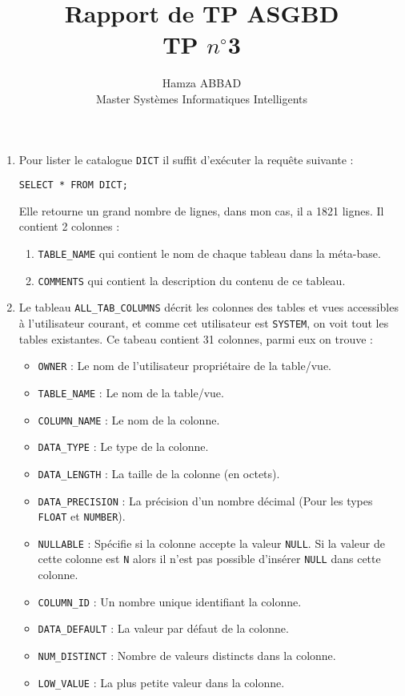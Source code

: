 \documentclass[12pt,a4paper]{article}
\author{Hamza ABBAD\\ Master Systèmes Informatiques Intelligents}
\title{\textbf{Rapport de TP ASGBD} \\ TP $n^{\circ}$3}
\begin{document}
\maketitle
\begin{enumerate}
	\item Pour lister le catalogue \texttt{DICT} il suffit d'exécuter la requête suivante :
	\begin{lstlisting}[style=OracleSQL]
		SELECT * FROM DICT;
	\end{lstlisting}
	Elle retourne un grand nombre de lignes, dans mon cas, il a 1821 lignes. Il contient 2 colonnes :
	\begin{enumerate}
		\item \texttt{TABLE\_NAME} qui contient le nom de chaque tableau dans la méta-base.
		\item \texttt{COMMENTS} qui contient la description du contenu de ce tableau.
	\end{enumerate}
	\item Le tableau \texttt{ALL\_TAB\_COLUMNS} décrit les colonnes des tables et vues accessibles à l'utilisateur courant, et
	comme cet utilisateur est \texttt{SYSTEM}, on voit tout les tables existantes.
	Ce tabeau contient 31 colonnes, parmi eux on trouve :
	\begin{itemize}
		\item \texttt{OWNER} : Le nom de l'utilisateur propriétaire de la table/vue.
		\item \texttt{TABLE\_NAME} : Le nom de la table/vue.
		\item \texttt{COLUMN\_NAME} : Le nom de la colonne.
		\item \texttt{DATA\_TYPE} : Le type de la colonne.
		\item \texttt{DATA\_LENGTH} : La taille de la colonne (en octets).
		\item \texttt{DATA\_PRECISION} : La précision d'un nombre décimal (Pour les types \texttt{FLOAT} et \texttt{NUMBER}).
		\item \texttt{NULLABLE} : Spécifie si la colonne accepte la valeur \texttt{NULL}. Si la valeur de cette colonne est \texttt{N}
		alors il n'est pas possible d'insérer \texttt{NULL} dans cette colonne.
		\item \texttt{COLUMN\_ID} : Un nombre unique identifiant la colonne.
		\item \texttt{DATA\_DEFAULT} : La valeur par défaut de la colonne.
		\item \texttt{NUM\_DISTINCT} : Nombre de valeurs distincts dans la colonne.
		\item \texttt{LOW\_VALUE} : La plus petite valeur dans la colonne.

\end{itemize}
\end{enumerate}
\end{document}
